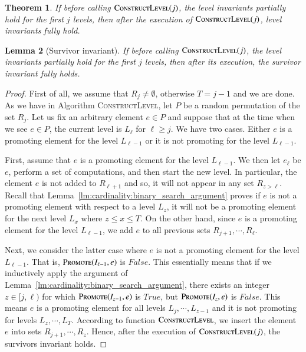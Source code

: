 \documentclass[11pt]{article}
\newtheorem{theorem}{Theorem}
\newtheorem{lemma}[theorem]{Lemma}
\newcommand{\constLevel}{\textsc{ConstructLevel}}
\newcommand{\suit}{\textsc{Promote}}
\begin{document}
\begin{theorem}
\label{thm:cardinality:invariants:leveling}
If before calling $\constLevel{}(j)$, the level invariants partially hold for the first $j$ levels,
then after the execution of $\constLevel{}(j)$, level invariants fully hold.
\end{theorem}

\begin{lemma}[Survivor invariant]
\label{lm:cardinality:survivor:leveling}
If before calling $\constLevel{}(j)$, the level invariants partially hold for the first $j$ levels,
then after its execution, the survivor invariant fully holds.
\end{lemma}

\begin{proof}
First of all, we assume that $R_j \neq \emptyset$, otherwise $T = j-1$ and we are done. 
As we have in Algorithm \constLevel{}, let $P$ be a random permutation of the set $R_j$. 
Let us fix an arbitrary element $e \in P$ and suppose that 
at the time when we see $e \in P$, the current level is $L_{\ell}$ for $\ell \ge j$. 
We have two cases. 
Either $e$ is a promoting element for the level $L_{\ell-1}$ or it is not promoting for the level $L_{\ell-1}$. 

First, assume that $e$ is a promoting element for the level $L_{\ell-1}$. 
We then let $e_{\ell}$ be $e$, perform a set of computations, and then start the new level. 
In particular, the element $e$ is not added to $R_{\ell+1}$ and so, it will not appear in any set $R_{z > \ell}$.
Recall that Lemma~\ref{lm:cardinality:binary_search_argument} proves if $e$ 
is not a promoting element with respect to a level $L_{z}$, 
it will not be a promoting element for the next level $L_{x}$ where $z\le x \le T$.
On the other hand, since $e$ is a promoting element for the level $L_{\ell-1}$, 
we add $e$ to all previous sets $R_{j+1},\cdots, R_{\ell}$. 

Next, we consider the latter case where $e$ is not a promoting element for the level $L_{\ell-1}$. 
That is, $\suit(I_{\ell-1}, e)$ is $False$.
This essentially means that if we inductively apply the argument of Lemma~\ref{lm:cardinality:binary_search_argument}, 
there exists an integer $z \in [j,\ell)$ for which 
$\suit(I_{z-1}, e)$ is $True$, but $\suit(I_{z}, e)$ is $False$. 
This means $e$ is a promoting element for all levels $L_j,\cdots,L_{z-1}$ and 
it is not promoting for levels $L_{z},\cdots,L_T$. 
According to function $\constLevel$, 
we insert the element $e$ into sets $R_{j+1}, \cdots, R_{z}$. 
Hence, after the execution of $\constLevel{}(j)$, 
the survivors invariant holds. 
\end{proof}
\end{document}
